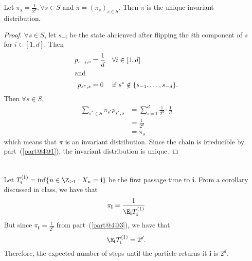 \documentclass[
  coursecode={MTHE 455},
  assignmentname={Assignment \assignmentnumber},
  studentnumber=20053722,
  name={Bryan Hoang},
  draft,
]{
  ltxanswer%
}
\begin{document}
\begin{questions}
\begin{parts}
      \part{}
      \begin{solution}
        \begin{claim}
          Let \(\pi_{s}=\frac{1}{2^{d}}, \forall s\in S\) and \(\pi=(\pi_{s})_{s\in S}\). Then \(\pi\) is the unique invariant distribution.
        \end{claim}
        \begin{proof}
          \(\forall s \in S\), let \(s_{-i}\) be the state ahcienved after flipping the \(i\)th component of \(s\) for \(i\in[1,d]\). Then
          \begin{align*}
            p_{s_{-i},s} &= \frac{1}{d} & &\forall i\in[1,d]                                 \\
            \intertext{and}
            p_{s^{*},s}  &= 0           & &\text{if}\ s^{*} \notin \{s_{-1},\dotsc,s_{-d}\}.
          \end{align*}
          Then \(\forall s \in S\),
          \begin{align*}
            \sum_{s^{*} \in S} \pi_{s^{*}} p_{s^{*},s} &= \sum_{i=1}^{d} \frac{1}{2^{d}} \cdot \frac{1}{d} \\
                                                       &= \frac{1}{2^{d}}                                  \\
                                                       &= \pi_{s}
          \end{align*}
          which means that \(\pi\) is an invariant distribution. Since the chain is irreducible by part~(\ref{part@4@1}), the invariant distribution is unique.
        \end{proof}
      \end{solution}

      \part{}
      \begin{solution}
        Let \(T_{\mathbf{i}}^{(1)}=\inf\{n\in\Z_{\ge1}:X_{n}=\mathbf{i}\}\) be the first passage time to \(\mathbf{i}\). From a corollary discussed in class, we have that
        \begin{equation*}
          \pi_{\mathbf{i}} = \frac{1}{\E_{\mathbf{i}}{T_{\mathbf{i}}^{(1)}}}
        \end{equation*}
        But since \(\pi_{\mathbf{i}}=\frac{1}{2^{d}}\) from part~(\ref{part@4@3}), we have that
        \begin{equation*}
          \E_{\mathbf{i}}{T_{\mathbf{i}}^{(1)}} = 2^{d}.
        \end{equation*}
        Therefore, the expected number of steps until the particle returns it \(\mathbf{i}\) is \(\boxed{2^{d}}\).
      \end{solution}


\end{parts}
\end{questions}
\end{document}
